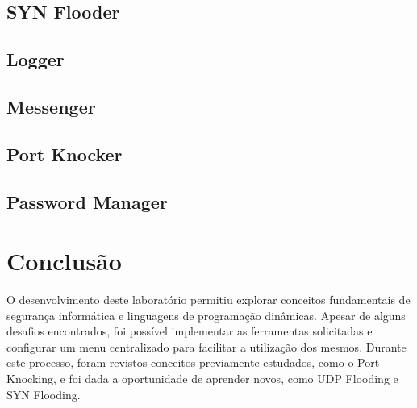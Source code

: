 \documentclass[a4paper]{article}
\begin{document}
\subsection{SYN Flooder}

\newpage
\subsection{Logger}

\newpage
\subsection{Messenger}

\newpage
\subsection{Port Knocker}

\newpage
\subsection{Password Manager}

\newpage
\section{Conclusão}\label{con}
O desenvolvimento deste laboratório permitiu explorar conceitos fundamentais de segurança informática 
e linguagens de programação dinâmicas. Apesar de alguns desafios encontrados, foi possível implementar as 
ferramentas solicitadas e configurar um menu centralizado para facilitar a utilização dos mesmos. 
Durante este processo, foram revistos conceitos previamente estudados, como o Port Knocking, 
e foi dada a oportunidade de aprender novos, como UDP Flooding e SYN Flooding.

\newpage
\renewcommand{\refname}{Bibliografia} %
\renewcommand{\bibname}{Bibliografia} %
\printbibliography
\end{document}
